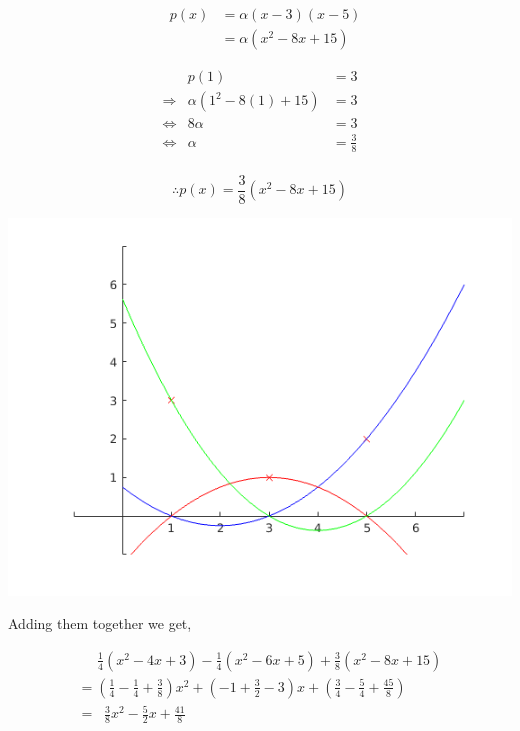 \documentclass[MathsNotesBase.tex]{subfiles}
\begin{document}
{	\begin{par}
	$$\begin{array}{lcr}
	&p(x) &= \alpha(x-3)(x-5)\\
	&&= \alpha(x^2-8x+15)
	\end{array}$$
	\end{par}
	
	\begin{par}
	$$\begin{array}{lcr}
	&p(1)&=3 \\
	\Longrightarrow &\alpha(1^2-8(1) + 15) &= 3 \\
	\iff &8\alpha&=3\\
	\iff &\alpha &= \frac{3}{8}\\
	\end{array}$$
	\end{par}
	
	\begin{par}
	$$\therefore p(x) = \frac{3}{8}(x^2-8x+15)$$
	\end{par}
	
	
	\begin{center}
	\includegraphics[width=\linewidth]{figure_3.png}
	\end{center}
	
	
	\begin{par}
	\begin{flushleft}
	Adding them together we get,
	\end{flushleft}
	\end{par}
	
	\begin{par}
	$$\begin{array}{lcr}
	\;\;\;\;\; \frac{1}{4}(x^2-4x+3) - \frac{1}{4}(x^2-6x+5) + \frac{3}{8}(x^2-8x+15) \\[8pt]
	= (\frac{1}{4}  - \frac{1}{4} + \frac{3}{8})x^2 + (-1 + \frac{3}{2} - 3)x + (\frac{3}{4} - \frac{5}{4} + \frac{45}{8}) \\[8pt]
	= \;\; \frac{3}{8}x^2 - \frac{5}{2}x + \frac{41}{8} 
	\end{array}$$
	\end{par}
	
}
\end{document}
